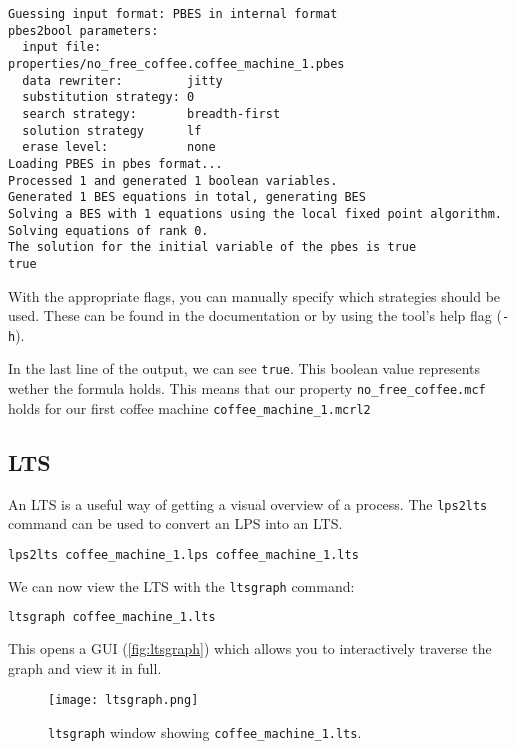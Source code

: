 \documentclass{clseminar}
\begin{document}
  \begin{lstlisting}
Guessing input format: PBES in internal format
pbes2bool parameters:
  input file:            properties/no_free_coffee.coffee_machine_1.pbes
  data rewriter:         jitty
  substitution strategy: 0
  search strategy:       breadth-first
  solution strategy      lf
  erase level:           none
Loading PBES in pbes format...
Processed 1 and generated 1 boolean variables.
Generated 1 BES equations in total, generating BES
Solving a BES with 1 equations using the local fixed point algorithm.
Solving equations of rank 0.
The solution for the initial variable of the pbes is true
true
  \end{lstlisting}

  With the appropriate flags, you can manually specify which strategies should be used. These can be found in the documentation \cite[pbes2bool]{mcrl2doc} or by using the tool's help flag (\texttt{-h}).

  In the last line of the output, we can see \texttt{true}. This boolean value represents wether the formula holds. This means that our property \texttt{no\_free\_coffee.mcf} holds for our first coffee machine \texttt{coffee\_machine\_1.mcrl2}

  \subsection{LTS}

  An LTS is a useful way of getting a visual overview of a process. The \texttt{lps2lts} command can be used to convert an LPS into an LTS.

  \begin{lstlisting}[language=Bash]
lps2lts coffee_machine_1.lps coffee_machine_1.lts
  \end{lstlisting}

  We can now view the LTS with the \texttt{ltsgraph} command:

  \begin{lstlisting}[language=Bash]
ltsgraph coffee_machine_1.lts
  \end{lstlisting}

  This opens a GUI (\autoref{fig:ltsgraph}) which allows you to interactively traverse the graph and view it in full.

  \begin{figure}[!ht]
    \texttt{[image: ltsgraph.png]}
    \caption{\texttt{ltsgraph} window showing \texttt{coffee\_machine\_1.lts}.}
    \label{fig:ltsgraph}
  \end{figure}
\end{document}
